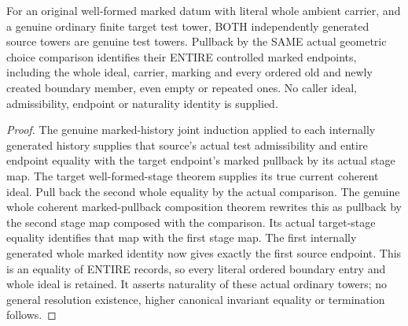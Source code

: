 \begin{theorem}
\label{hir:submersion-cartesian-choice-whole-marked}
\leanok
{}
For an original well-formed marked datum with literal whole ambient
carrier, and a genuine ordinary finite target test tower, BOTH independently
generated source towers are genuine test towers. Pullback by the SAME
actual geometric choice comparison identifies their ENTIRE controlled
marked endpoints, including the whole ideal, carrier, marking and every
ordered old and newly created boundary member, even empty or repeated ones.
No caller ideal, admissibility, endpoint or naturality identity is supplied.
\end{theorem}
\begin{proof}
The genuine marked-history joint induction applied to each internally
generated history supplies that source's actual test admissibility and
entire endpoint equality with the target endpoint's marked pullback by its
actual stage map. The target well-formed-stage theorem supplies its true
current coherent ideal. Pull back the second whole equality by the actual
comparison. The genuine whole coherent marked-pullback composition theorem
rewrites this as pullback by the second stage map composed with the
comparison. Its actual target-stage equality identifies that map with the
first stage map. The first internally generated whole marked identity now
gives exactly the first source endpoint. This is an equality of ENTIRE
records, so every literal ordered boundary entry and whole ideal is retained.
It asserts naturality of these actual ordinary towers; no general resolution
existence, higher canonical invariant equality or termination follows.
\end{proof}

